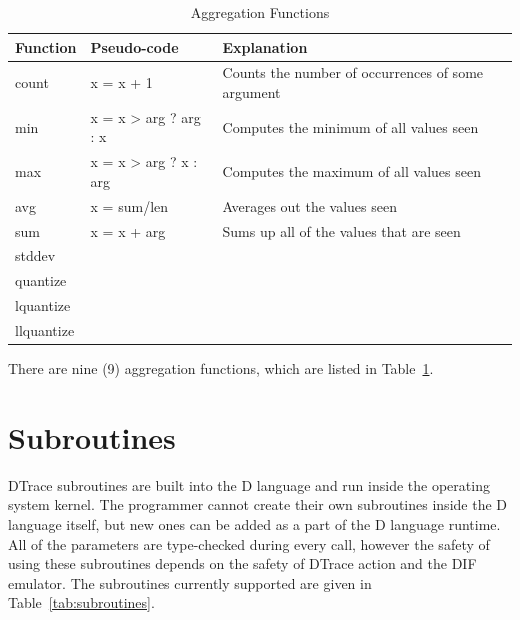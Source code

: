\begin{table}
  \centering
  \begin{tabular}{l|l|l}
    Function & Pseudo-code & Explanation \\
    \hline
    count & x = x + 1 & Counts the number of occurrences of some argument \\
    min & x = x > arg ? arg : x & Computes the minimum of all values seen \\
    max & x = x > arg ? x : arg & Computes the maximum of all values seen \\
    avg & x = sum/len & Averages out the values seen \\
    sum & x = x + arg & Sums up all of the values that are seen \\
    stddev & & \\
    quantize & & \\
    lquantize & & \\
    llquantize & &
  \end{tabular}
  \caption{Aggregation Functions}
  \label{tab:agg-func}
\end{table}

There are nine (9) aggregation functions, which are listed in
Table~\ref{tab:agg-func}.

\section{Subroutines}
\label{sec:subroutines}

DTrace subroutines are built into the D language and run inside the
operating system kernel. The programmer cannot create their own subroutines
inside the D language itself, but new ones can be added as a part of the D
language runtime. All of the parameters are type-checked during every call,
however the safety of using these subroutines depends on the safety of DTrace
action and the DIF emulator. The subroutines currently supported are given
in Table~\ref{tab:subroutines}.

